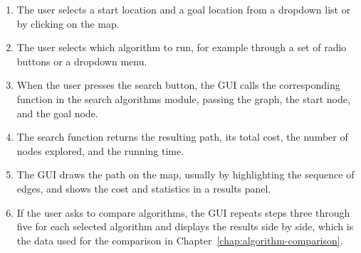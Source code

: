 \begin{enumerate}[itemsep=2pt]
  \item The user selects a start location and a goal location from a dropdown list or by clicking on the map.
  \item The user selects which algorithm to run, for example through a set of radio buttons or a dropdown menu.
  \item When the user presses the search button, the GUI calls the corresponding function in the search algorithms module, passing the graph, the start node, and the goal node.
  \item The search function returns the resulting path, its total cost, the number of nodes explored, and the running time.
  \item The GUI draws the path on the map, usually by highlighting the sequence of edges, and shows the cost and statistics in a results panel.
  \item If the user asks to compare algorithms, the GUI repeats steps three through five for each selected algorithm and displays the results side by side, which is the data used for the comparison in Chapter~\ref{chap:algorithm-comparison}.
\end{enumerate}
